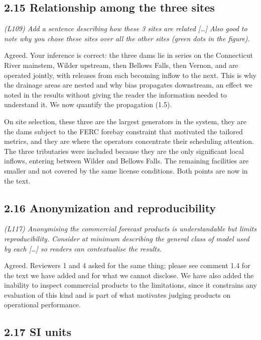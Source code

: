 \documentclass[11pt]{article}
\newenvironment{rc}%
  {\begin{list}{}{\setlength{\leftmargin}{1.5em}\setlength{\rightmargin}{1.5em}%
   \setlength{\topsep}{0.2em}\setlength{\parsep}{0pt}\setlength{\itemsep}{0pt}}%
   \item[]\itshape\color{quotegray}}%
  {\end{list}}
\begin{document}
\subsection*{2.15 Relationship among the three sites}

\begin{rc}
(L109) Add a sentence describing how these 3 sites are related [\ldots] Also good to note
why you chose these sites over all the other sites (green dots in the figure).
\end{rc}

Agreed. Your inference
is correct: the three dams lie in series on the Connecticut River mainstem, Wilder upstream,
then Bellows Falls, then Vernon, and are operated jointly, with releases from each becoming
inflow to the next. This is why the drainage areas are nested and why bias propagates
downstream, an effect we noted in the results without giving the reader the information needed
to understand it. We now quantify the propagation (1.5).

On site selection, these three are the largest generators in the system, they are the dams
subject to the FERC forebay constraint that motivated the tailored metrics, and they are where
the operators concentrate their scheduling attention. The three tributaries were included
because they are the only significant local inflows, entering between Wilder and Bellows
Falls. The remaining facilities are smaller and not covered by the same license conditions.
Both points are now in the text.

\subsection*{2.16 Anonymization and reproducibility}

\begin{rc}
(L117) Anonymising the commercial forecast products is understandable but limits
reproducibility. Consider at minimum describing the general class of model used by each
[\ldots] so readers can contextualise the results.
\end{rc}

Agreed. Reviewers 1 and 4 asked for the same thing; please see comment 1.4 for the text we
have added and for what we cannot disclose. We have also added the inability to inspect
commercial products to the limitations, since it constrains any evaluation of this kind and is
part of what motivates judging products on operational performance.

\subsection*{2.17 SI units}
\end{document}
